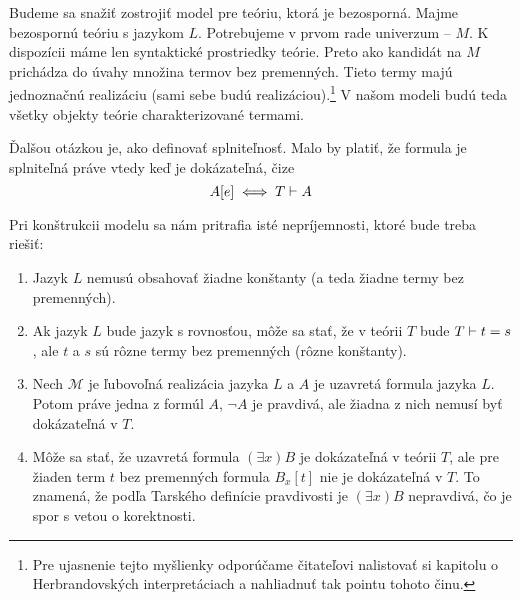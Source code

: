 \begin{dokaz}
    Budeme sa snažiť zostrojiť model pre teóriu, ktorá je bezosporná.
    Majme bezospornú teóriu s jazykom $L$.
    Potrebujeme v prvom rade univerzum -- $M$.
    K dispozícii máme len syntaktické prostriedky teórie.
    Preto ako kandidát na $M$ prichádza do úvahy
    množina termov bez premenných.
    Tieto termy majú jednoznačnú realizáciu (sami sebe budú
    realizáciou).\footnote{
        Pre ujasnenie tejto myšlienky odporúčame čitateľovi
        nalistovať si kapitolu o Herbrandovských interpretáciach
        a nahliadnuť tak pointu tohoto činu.
    }
    V našom modeli budú teda všetky objekty teórie charakterizované termami.

    Ďalšou otázkou je, ako definovať splniteľnosť. Malo by platiť, že
    formula je splniteľná práve vtedy keď je dokázateľná, čize
    \begin{equation*}
    A[e] \iff T \vdash A
    \end{equation*}

    Pri konštrukcii modelu sa nám pritrafia isté nepríjemnosti, ktoré bude 
    treba riešiť:
    \begin{enumerate}
    \item \label{en:model_problem_konst}
        Jazyk $L$ nemusú obsahovať žiadne konštanty (a teda žiadne termy bez
        premenných).

    \item \label{en:model_problem_rovnost}
        Ak jazyk $L$ bude jazyk s rovnosťou, môže sa stať, že v teórii $T$
        bude $T \vdash t=s$, ale $t$ a $s$ sú rôzne termy bez
        premenných (rôzne konštanty).

    \item \label{en:model_problem_neg}
        Nech $\mathcal{M}$ je ľubovoľná realizácia jazyka $L$ a $A$ je uzavretá
        formula jazyka $L$. Potom práve jedna z formúl $A$, $\neg A$ je
        pravdivá, ale žiadna z nich nemusí byť dokázateľná v $T$.

    \item \label{en:model_problem_korektnost}
        Môže sa stať, že uzavretá formula $(\exists x)B$ je dokázateľná v teórii
        $T$, ale pre žiaden term $t$ bez premenných formula $B_x[t]$ nie
        je dokázateľná v $T$. To znamená, že
        podľa Tarského definície pravdivosti je $(\exists x)B$
        nepravdivá, čo je spor s vetou o korektnosti.
    \end{enumerate}


\end{dokaz}
